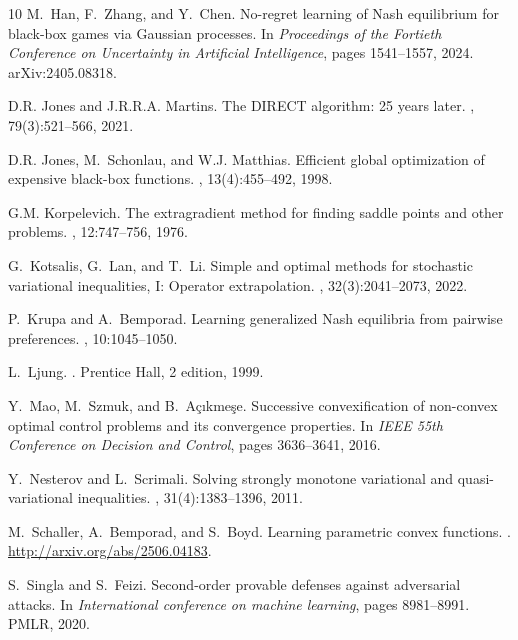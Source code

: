 \documentclass[11pt, a4paper]{article}
\theoremstyle{remark}
\theoremstyle{plain}
\begin{document}
\begin{thebibliography}{10}
M.~Han, F.~Zhang, and Y.~Chen.
\newblock No-regret learning of {N}ash equilibrium for black-box games via {G}aussian processes.
\newblock In {\em Proceedings of the Fortieth Conference on Uncertainty in Artificial Intelligence}, pages 1541--1557, 2024.
\newblock arXiv:2405.08318.

D.R. Jones and J.R.R.A. Martins.
\newblock The {DIRECT} algorithm: 25 years later.
, 79(3):521--566, 2021.

D.R. Jones, M.~Schonlau, and W.J. Matthias.
\newblock Efficient global optimization of expensive black-box functions.
, 13(4):455--492, 1998.

G.M. Korpelevich.
\newblock The extragradient method for finding saddle points and other problems.
, 12:747--756, 1976.

G.~Kotsalis, G.~Lan, and T.~Li.
\newblock Simple and optimal methods for stochastic variational inequalities, {I}: Operator extrapolation.
, 32(3):2041--2073, 2022.

P.~Krupa and A.~Bemporad.
\newblock Learning generalized {Nash} equilibria from pairwise preferences.
, 10:1045--1050.

L.~Ljung.
.
\newblock Prentice Hall, 2 edition, 1999.

Y.~Mao, M.~Szmuk, and B.~A{\c{c}}{\i}kme{\c{s}}e.
\newblock Successive convexification of non-convex optimal control problems and its convergence properties.
\newblock In {\em IEEE 55th Conference on Decision and Control}, pages 3636--3641, 2016.

Y.~Nesterov and L.~Scrimali.
\newblock Solving strongly monotone variational and quasi-variational inequalities.
, 31(4):1383--1396, 2011.

M.~Schaller, A.~Bemporad, and S.~Boyd.
\newblock Learning parametric convex functions.
.
\newblock \url{http://arxiv.org/abs/2506.04183}.

S.~Singla and S.~Feizi.
\newblock Second-order provable defenses against adversarial attacks.
\newblock In {\em International conference on machine learning}, pages 8981--8991. PMLR, 2020.


\end{thebibliography}
\end{document}
